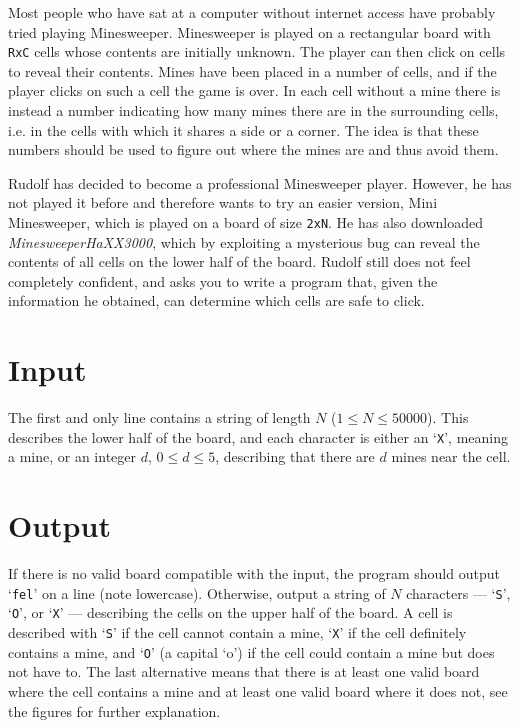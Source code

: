 Most people who have sat at a computer without internet access have probably tried playing Minesweeper. Minesweeper is played on a rectangular board with \texttt{RxC} cells whose contents are initially unknown. The player can then click on cells to reveal their contents. Mines have been placed in a number of cells, and if the player clicks on such a cell the game is over. In each cell without a mine there is instead a number indicating how many mines there are in the surrounding cells, i.e. in the cells with which it shares a side or a corner. The idea is that these numbers should be used to figure out where the mines are and thus avoid them.

Rudolf has decided to become a professional Minesweeper player. However, he has not played it before and therefore wants to try an easier version, Mini Minesweeper, which is played on a board of size \texttt{2xN}. He has also downloaded \emph{MinesweeperHaXX3000}, which by exploiting a mysterious bug can reveal the contents of all cells on the lower half of the board. Rudolf still does not feel completely confident, and asks you to write a program that, given the information he obtained, can determine which cells are safe to click.

\section*{Input}
The first and only line contains a string of length $N$ ($1 \leq N \leq 50000$). This describes the lower half of the board, and each character is either an `\texttt{X}', meaning a mine, or an integer $d$, $0 \leq d \leq 5$, describing that there are $d$ mines near the cell.

\section*{Output}
If there is no valid board compatible with the input, the program should output `\texttt{fel}' on a line (note lowercase). Otherwise, output a string of $N$ characters --- `\texttt{S}', `\texttt{O}', or `\texttt{X}' --- describing the cells on the upper half of the board. A cell is described with `\texttt{S}' if the cell cannot contain a mine, `\texttt{X}' if the cell definitely contains a mine, and `\texttt{O}' (a capital `o') if the cell could contain a mine but does not have to. The last alternative means that there is at least one valid board where the cell contains a mine and at least one valid board where it does not, see the figures for further explanation.



